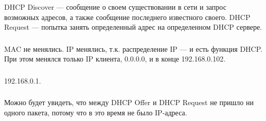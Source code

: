 \subsubsection{}
DHCP Discover --- сообщение о своем существовании в сети и запрос возможных адресов,
а также сообщение последнего известного своего.
DHCP Request --- попытка занять определенный адрес на определенном DHCP сервере.

\subsubsection{}
MAC не менялись.
IP менялись, т.к. распределение IP --- и есть функция DHCP\@.
При этом менялся только IP клиента, 0.0.0.0, и в конце 192.168.0.102.

\subsubsection{}
192.168.0.1.

\subsubsection{}
Можно будет увидеть, что между DHCP Offer и DHCP Request не пришло ни одного пакета,
потому что в это время не было IP-адреса.
